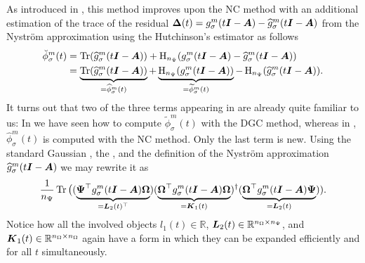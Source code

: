 As introduced in , this method improves
upon the \gls{NC} method with an additional estimation of the trace of the
residual $\boldsymbol{\Delta}(t) = g_{\sigma}^m(t\boldsymbol{I} - \boldsymbol{A}) - \widehat{g}_{\sigma}^m(t\boldsymbol{I} - \boldsymbol{A})$
from the Nystr\"om approximation using the Hutchinson's estimator
 as follows
\begin{align}
    \breve{\phi}_{\sigma}^m(t)
    &= \operatorname{Tr}(\widehat{g}_{\sigma}^m(t\boldsymbol{I} - \boldsymbol{A}))
    + \operatorname{H}_{n_{\Psi}}(g_{\sigma}^m(t\boldsymbol{I} - \boldsymbol{A}) - \widehat{g}_{\sigma}^m(t\boldsymbol{I} - \boldsymbol{A})) \notag \\
    &= \underbrace{\operatorname{Tr}(\widehat{g}_{\sigma}^m(t\boldsymbol{I} - \boldsymbol{A}))}_{=\widehat{\phi}_{\sigma}^m(t)}
    + \underbrace{\operatorname{H}_{n_{\Psi}}(g_{\sigma}^m(t\boldsymbol{I} - \boldsymbol{A}))}_{=\widetilde{\phi}_{\sigma}^m(t)}
    - \operatorname{H}_{n_{\Psi}}(\widehat{g}_{\sigma}^m(t\boldsymbol{I} - \boldsymbol{A})).
    \label{equ:4-nystromchebyshev-spectral-density-decomposition}
\end{align}
It turns out that two of the three terms appearing in 
are already quite familiar to us: In  we have seen
how to compute $\widetilde{\phi}_{\sigma}^m(t)$ with the \gls{DGC} method, whereas
in , $\widehat{\phi}_{\sigma}^m(t)$ is computed with the \gls{NC}
method. Only the last term is new. Using the standard Gaussian ,
the , and the definition of the Nystr\"om approximation
$\widehat{g}_{\sigma}^m(t\boldsymbol{I} - \boldsymbol{A})$ 
we may rewrite it as
\begin{equation}
    \frac{1}{n_{\Psi}}\operatorname{Tr}\big(
        (\underbrace{\boldsymbol{\Psi}^{\top} g_{\sigma}^m(t\boldsymbol{I} - \boldsymbol{A}) \boldsymbol{\Omega}}_{=\boldsymbol{L}_2(t)^{\top}})
        (\underbrace{\boldsymbol{\Omega}^{\top} g_{\sigma}^m(t\boldsymbol{I} - \boldsymbol{A}) \boldsymbol{\Omega}}_{=\boldsymbol{K}_1(t)})^{\dagger}
        (\underbrace{\boldsymbol{\Omega}^{\top} g_{\sigma}^m(t\boldsymbol{I} - \boldsymbol{A}) \boldsymbol{\Psi}}_{=\boldsymbol{L}_2(t)})
      ).
\end{equation}
Notice how all the involved objects $l_1(t) \in \mathbb{R}$, $\boldsymbol{L}_2(t) \in \mathbb{R}^{n_{\Omega} \times n_{\Psi}}$, and $\boldsymbol{K}_1(t) \in \mathbb{R}^{n_{\Omega} \times n_{\Omega}}$
again have a form in which they can be expanded efficiently and for all $t$ simultaneously.\\

